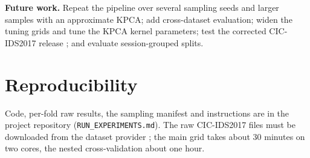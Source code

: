 \documentclass[conference]{IEEEtran}
\begin{document}
\textbf{Future work.} Repeat the pipeline over several sampling seeds and larger samples with an approximate KPCA; add cross-dataset evaluation; widen the tuning grids and tune the KPCA kernel parameters; test the corrected CIC-IDS2017 release \cite{engelen2021}; and evaluate session-grouped splits.

\section*{Reproducibility}
Code, per-fold raw results, the sampling manifest and instructions are in the project repository (\texttt{RUN\_EXPERIMENTS.md}). The raw CIC-IDS2017 files must be downloaded from the dataset provider \cite{sharafaldin2018}; the main grid takes about 30 minutes on two cores, the nested cross-validation about one hour.


\end{document}
